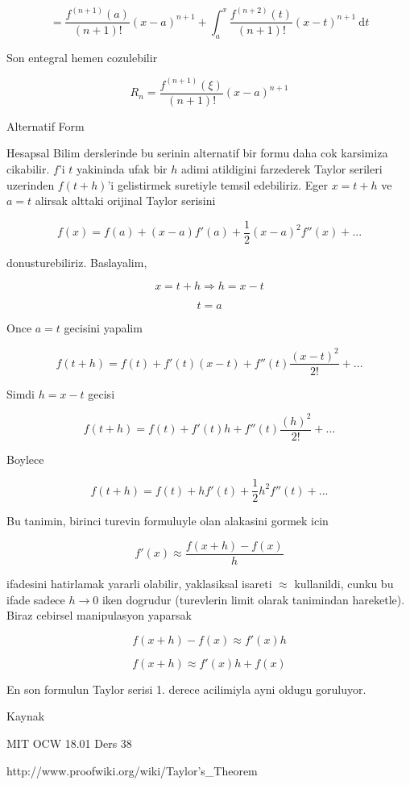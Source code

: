 \documentclass[12pt,fleqn]{article}\usepackage{../common}
\begin{document}
\[ = \frac{f^{(n+1)} (a)}{(n+1)!} (x - a)^{n+1} + \int_a^x \frac{f^{(n+2)} \left({t}\right)} {(n+1)!} \left({x - t}\right)^{n+1} \ \mathrm d t \]

Son entegral hemen cozulebilir

\[ R_n = \frac{f^{(n+1)}(\xi)}{(n+1)!} (x-a)^{n+1} \]

Alternatif Form

Hesapsal Bilim derslerinde bu serinin alternatif bir formu daha cok
karsimiza cikabilir. $f$'i $t$ yakininda ufak bir $h$ adimi atildigini
farzederek Taylor serileri uzerinden $f(t+h)$'i gelistirmek suretiyle
temsil edebiliriz. Eger $x = t+h$ ve $a = t$ alirsak alttaki orijinal
Taylor serisini

\[ f(x) = f (a)+(x-a) f'(a) + \frac1 2 (x-a)^2f''(x) + ...\]

donusturebiliriz. Baslayalim,

\[ x = t + h \Rightarrow h = x-t \]

\[ t = a \]

Once $a=t$ gecisini yapalim

\[ f(t+h) = f(t) +  f'(t)(x-t) + f''(t)\frac{(x-t)^2}{2!} + ...\]

Simdi $h = x-t$ gecisi

\[ f(t+h) = f(t) +  f'(t)h + f''(t)\frac{(h)^2}{2!} + ...\]

Boylece

\[ f(t+h) = f (t)+h f'(t) + \frac 1 2 h^2 f''(t) + ...\]

Bu tanimin, birinci turevin formuluyle olan alakasini gormek icin

\[ f'(x) \approx \frac {f(x+h) - f(x)}{h} \]

ifadesini hatirlamak yararli olabilir, yaklasiksal isareti $\approx$
kullanildi, cunku bu ifade sadece $h \to 0$ iken dogrudur (turevlerin limit
olarak tanimindan hareketle). Biraz cebirsel manipulasyon yaparsak

\[ f(x+h) - f(x) \approx f'(x)h  \]

\[ f(x+h)  \approx f'(x)h + f(x) \]

En son formulun Taylor serisi 1. derece acilimiyla ayni oldugu goruluyor. 

Kaynak

MIT OCW 18.01 Ders 38

http://www.proofwiki.org/wiki/Taylor's\_Theorem
\end{document}
